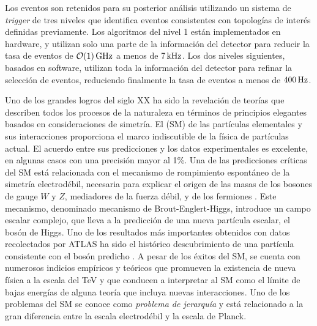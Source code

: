 Los eventos son retenidos para su posterior análisis utilizando un sistema de
\emph{trigger} de tres niveles \cite{Aad:2012xs} que identifica eventos consistentes
con topologías de interés definidas previamente. Los algoritmos del nivel 1 están
implementados en hardware, y utilizan solo una parte de la información del detector para
reducir la tasa de eventos de $\unit[\mathcal{O}(1)]{GHz}$ a menos de $\unit[7]{kHz}$. Los dos niveles siguientes,
basados en software, utilizan toda la información del detector para refinar la selección
de eventos, reduciendo finalmente la tasa de eventos a menos de  $\unit[400]{Hz}$.

Uno de los grandes logros del siglo XX ha sido la revelación de teorías que
describen todos los procesos de la naturaleza en términos de principios
elegantes basados en consideraciones de simetría. El {\SM} (SM)
\cite{PhysRevLett.19.1264,PhysRev.127.965,Glashow1961579} de las partículas
elementales y sus interacciones proporciona el marco indiscutible de la física
de partículas actual. El acuerdo entre sus predicciones y los datos
experimentales es excelente, en algunas casos con una precisión mayor al 1\%.
Una de las predicciones críticas del SM está relacionada con el mecanismo de
rompimiento espontáneo de la simetría electrodébil, necesaria para explicar el
origen de las masas de los bosones de gauge $W$ y $Z$, mediadores de la fuerza
débil, y de los fermiones \cite{PhysRevLett.13.321,PhysRevLett.13.508}. Este
mecanismo, denominado mecanismo de Brout-Englert-Higgs, introduce un campo escalar complejo,
que lleva a la predicción de
una nueva partícula escalar, el bosón de Higgs. Uno de los resultados más
importantes obtenidos con datos recolectados por ATLAS ha sido el histórico
descubrimiento de una partícula consistente con el bosón predicho \cite{Aad:2012tfa}.
A pesar de los éxitos del SM, se cuenta con numerosos
indicios empíricos y teóricos que promueven la existencia de nueva física a la
escala del TeV y que conducen a interpretar al SM como el límite de bajas
energías de alguna teoría que incluya nuevas interacciones.
Uno de los problemas del SM se conoce como \emph{problema de jerarquía} y está
relacionado a la gran diferencia entre la escala electrodébil y la escala de Planck.

